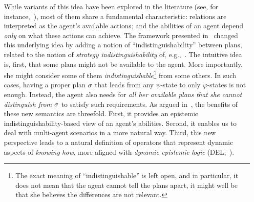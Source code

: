 While variants of this idea have been explored in the literature (see, for instance,~\cite{Li17,LiWang17,FervariHLW17,Wang19a}),
most of them share a fundamental characteristic: relations are interpreted as the agent's available actions; and the abilities of an agent depend \emph{only} on what these actions can achieve. The framework presented in~\cite{AFSVQ21,AFSVQ23report} changed this underlying idea by adding a notion of ``indistinguishability'' between plans, related to the notion of \emph{strategy indistinguishability} of, e.g.,~\cite{JamrogaH04,Belardinelli14}. The intuitive idea is, first, that some plans might not be available to the agent. More importantly, she might consider some of them \emph{indistinguishable}\footnote{The exact meaning of ``indistinguishable'' is left open, and in particular, it does not mean that the agent cannot tell the plans apart, it might well be that she believes the differences are not relevant.} from some others. In such cases, having a proper plan $\sigma$ that leads from any $\psi$-state to only $\varphi$-states is not enough. Instead, the agent also needs for \emph{all her available plans that she cannot distinguish from $\sigma$} to satisfy such requirements. As argued in~\cite{AFSVQ21}, the benefits of these new semantics are threefold. First, it provides an epistemic indistinguishability-based  view of an agent's abilities. Second, it enables us to deal with multi-agent scenarios in a more natural way. Third, this new perspective leads to a natural definition of operators that represent dynamic aspects of \emph{knowing how}, more aligned with \emph{dynamic epistemic logic} (DEL;~\cite{DELbook}).


